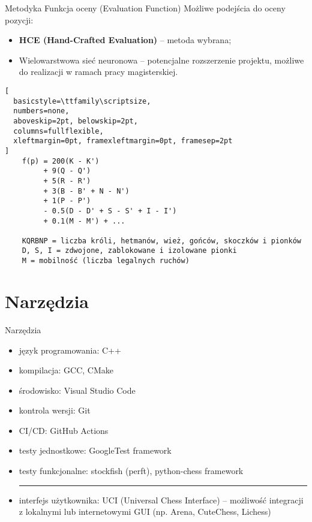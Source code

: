 \documentclass[aspectratio=1610, english]{beamer}
\begin{document}

\begin{frame}[fragile]{Metodyka Funkcja oceny (Evaluation Function)}
    Możliwe podejścia do oceny pozycji:
    \newline
    \begin{itemize}
        \item \textbf{HCE (Hand-Crafted Evaluation)} – metoda wybrana;
        \newline 
        \item Wielowarstwowa sieć neuronowa – potencjalne rozszerzenie projektu, możliwe do realizacji w ramach pracy magisterskiej.
    \end{itemize}

    \begin{lstlisting}[
  basicstyle=\ttfamily\scriptsize,
  numbers=none,
  aboveskip=2pt, belowskip=2pt,
  columns=fullflexible,
  xleftmargin=0pt, framexleftmargin=0pt, framesep=2pt
]
    f(p) = 200(K - K')
         + 9(Q - Q')
         + 5(R - R')
         + 3(B - B' + N - N')
         + 1(P - P')
         - 0.5(D - D' + S - S' + I - I')
         + 0.1(M - M') + ...

    KQRBNP = liczba króli, hetmanów, wież, gońców, skoczków i pionków
    D, S, I = zdwojone, zablokowane i izolowane pionki
    M = mobilność (liczba legalnych ruchów)
    \end{lstlisting}
\end{frame}



\section{Narzędzia}
\begin{frame}{Narzędzia}
    \begin{itemize}
        \item język programowania: C++
        \item kompilacja: GCC, CMake
        \item środowisko: Visual Studio Code
        \item kontrola wersji: Git 
        \item CI/CD: GitHub Actions
        \item testy jednostkowe: GoogleTest framework
        \item testy funkcjonalne: stockfish (perft), python-chess framework
        \noindent\rule{\textwidth}{0.5pt}
        \item interfejs użytkownika: UCI (Universal Chess Interface) – możliwość integracji z lokalnymi lub internetowymi GUI (np. Arena, CuteChess, Lichess)
    \end{itemize}
\end{frame}
\end{document}
